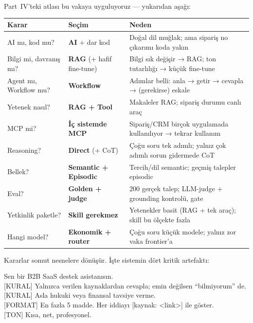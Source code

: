 Part~IV'teki atlası bu vakaya uyguluyoruz --- yukarıdan aşağı:\par
\vspace{2pt}
\noindent\begin{tabularx}{\linewidth}{@{}>{\raggedright\arraybackslash}p{30mm} >{\raggedright\arraybackslash}p{32mm} L@{}}
\toprule
{\sffamily\bfseries\small Karar} & {\sffamily\bfseries\small Seçim} & {\sffamily\bfseries\small Neden} \\
\midrule
AI mı, kod mu? & \textbf{AI} + dar kod & Doğal dil muğlak; ama sipariş no çıkarımı koda yakın \\
Bilgi mi, davranış mı? & \textbf{RAG} (+ hafif fine-tune) & Bilgi sık değişir → RAG; ton tutarlılığı → küçük fine-tune \\
Agent mı, Workflow mu? & \textbf{Workflow} & Adımlar belli: anla → getir → cevapla → (gerekirse) eskale \\
Yetenek nasıl? & \textbf{RAG + Tool} & Makaleler RAG; sipariş durumu canlı araç \\
MCP mi? & \textbf{İç sistemde MCP} & Sipariş/CRM birçok uygulamada kullanılıyor → tekrar kullanım \\
Reasoning? & \textbf{Direct} (+ CoT) & Çoğu soru tek adımlı; yalnız çok adımlı sorun gidermede CoT \\
Bellek? & \textbf{Semantic + Episodic} & Tercih/dil semantic; geçmiş talepler episodic \\
Eval? & \textbf{Golden + judge} & 200 gerçek talep; LLM-judge + grounding kontrolü, gate \\
Yetkinlik paketle? & \textbf{Skill gerekmez} & Yetenekler basit (RAG + tek araç); skill bu ölçekte fazla \\
Hangi model? & \textbf{Ekonomik + router} & Çoğu soru küçük modele; yalnız zor vaka frontier'a \\
\bottomrule
\end{tabularx}

Kararlar somut nesnelere dönüşür. İşte sistemin dört kritik artefaktı:

\begin{artifact} Sen bir B2B SaaS destek asistanısın.\\
{}[KURAL] Yalnızca verilen kaynaklardan cevapla; emin değilsen ``bilmiyorum'' de.\\
{}[KURAL] Asla hukuki veya finansal tavsiye verme.\\
{}[FORMAT] En fazla 5 madde. Her iddiayı [kaynak: <link>] ile göster.\\
{}[TON] Kısa, net, profesyonel.
\end{artifact}

